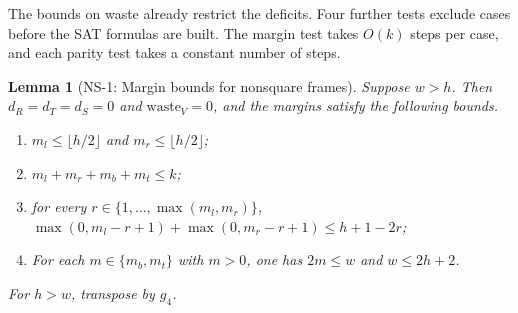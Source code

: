 \documentclass[11pt,a4paper]{article}
\theoremstyle{result}
\newtheorem{lemma}[theorem]{Lemma}
\theoremstyle{definition}
\theoremstyle{remark}
\newcommand{\waste}{\mathrm{waste}}
\begin{document}
The bounds on waste already restrict the deficits. Four further
tests exclude cases before the SAT formulas are built. The margin
test takes $O(k)$ steps per case, and each parity test takes a
constant number of steps.

\begin{lemma}[NS-1: Margin bounds for nonsquare frames]\label{lem:ns1}
Suppose $w>h$. Then $d_R=d_T=d_S=0$ and $\waste_V=0$, and
the margins satisfy the following bounds.
\begin{enumerate}[label=(\roman*),leftmargin=2em,itemsep=2pt]
  \item $m_l \le \lfloor h/2 \rfloor$ and $m_r \le \lfloor h/2 \rfloor$;
  \item $m_l + m_r + m_b + m_t \le k$;
  \item for every $r \in \{1, \dots, \max(m_l, m_r)\}$, $\max(0, m_l - r + 1) + \max(0, m_r - r + 1) \le h + 1 - 2r$;
  \item For each $m\in\{m_b,m_t\}$ with $m>0$, one has
    $2m\le w$ and $w\le 2h+2$.
\end{enumerate}
For $h>w$, transpose by $g_4$.
\end{lemma}
\end{document}
